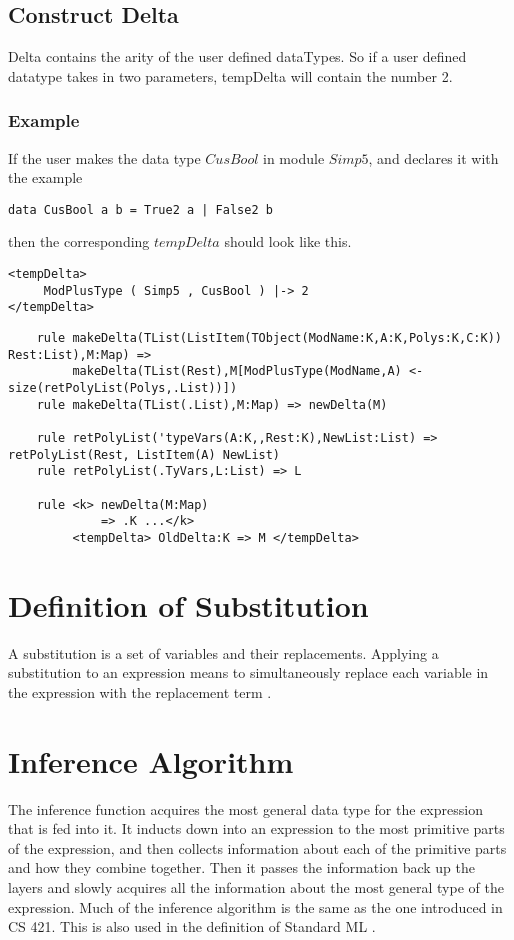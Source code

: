 \subsection{Construct Delta}
Delta contains the arity of the user defined dataTypes. So if a user defined datatype takes in two parameters, tempDelta will contain the number 2.

\subsubsection{Example}
If the user makes the data type $CusBool$ in module $Simp5$, and declares it with the example
\begin{lstlisting}
data CusBool a b = True2 a | False2 b
\end{lstlisting}

\noindent
then the corresponding $tempDelta$ should look like this.

\begin{lstlisting}
<tempDelta>
     ModPlusType ( Simp5 , CusBool ) |-> 2
</tempDelta>
\end{lstlisting}

\begin{lstlisting}
    rule makeDelta(TList(ListItem(TObject(ModName:K,A:K,Polys:K,C:K)) Rest:List),M:Map) =>
         makeDelta(TList(Rest),M[ModPlusType(ModName,A) <- size(retPolyList(Polys,.List))])
    rule makeDelta(TList(.List),M:Map) => newDelta(M)

    rule retPolyList('typeVars(A:K,,Rest:K),NewList:List) => retPolyList(Rest, ListItem(A) NewList)
    rule retPolyList(.TyVars,L:List) => L

    rule <k> newDelta(M:Map)
             => .K ...</k>
         <tempDelta> OldDelta:K => M </tempDelta>

\end{lstlisting}


\section{Definition of Substitution}
A substitution is a set of variables and their replacements. Applying a substitution to an expression means to simultaneously replace each variable in the expression with the replacement term \cite{Infer:TypeSub}.

\section{Inference Algorithm}
The inference function acquires the most general data type for the expression that is fed into it. It inducts down into an expression to the most primitive parts of the expression, and then collects information about each of the primitive parts and how they combine together. Then it passes the information back up the layers and slowly acquires all the information about the most general type of the expression. 
Much of the inference algorithm is the same as the one introduced in CS 421. This is also used in the definition of Standard ML \cite{CS421:Unif, Milner90thedefinition}.

